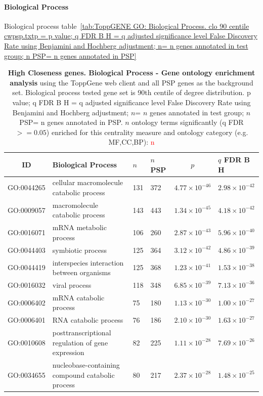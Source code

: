 \paragraph{Biological Process}
Biological process table~\ref{tab:ToppGENE GO: Biological Process. clo 90 centile cwpsp.txtp = p value; q FDR B H = q adjusted significance level False Discovery Rate using Benjamini and Hochberg adjustment; n= n genes annotated in test group; n PSP= n genes annotated in PSP}

\begin{table}[ht]
\centering
\begin{adjustbox}{width=\textwidth}
\setlength{\extrarowheight}{2pt}
\begin{tabular}{@{}clllcl@{}}
  \toprule
  ID & Biological Process & $n$ & $n$ PSP & $p$ & $q$ FDR B H \\ 

  \midrule
GO:0044265 & cellular macromolecule catabolic process & 131 & 372 & $4.77 \times 10^{-46}$ & $2.98 \times 10^{-42}$ \\ 
  GO:0009057 & macromolecule catabolic process & 143 & 443 & $1.34 \times 10^{-45}$ & $4.18 \times 10^{-42}$ \\ 
  GO:0016071 & mRNA metabolic process & 106 & 260 & $2.87 \times 10^{-43}$ & $5.96 \times 10^{-40}$ \\ 
  GO:0044403 & symbiotic process & 125 & 364 & $3.12 \times 10^{-42}$ & $4.86 \times 10^{-39}$ \\ 
  GO:0044419 & interspecies interaction between organisms & 125 & 368 & $1.23 \times 10^{-41}$ & $1.53 \times 10^{-38}$ \\ 
  GO:0016032 & viral process & 118 & 348 & $6.85 \times 10^{-39}$ & $7.13 \times 10^{-36}$ \\ 
  GO:0006402 & mRNA catabolic process & 75 & 180 & $1.13 \times 10^{-30}$ & $1.00 \times 10^{-27}$ \\ 
  GO:0006401 & RNA catabolic process & 76 & 186 & $2.10 \times 10^{-30}$ & $1.63 \times 10^{-27}$ \\ 
  GO:0010608 & posttranscriptional regulation of gene expression & 82 & 225 & $1.11 \times 10^{-28}$ & $7.69 \times 10^{-26}$ \\ 
  GO:0034655 & nucleobase-containing compound catabolic process & 80 & 217 & $2.37 \times 10^{-28}$ & $1.48 \times 10^{-25}$ \\ 
   \bottomrule
\end{tabular}
\end{adjustbox}
\caption[Gene ontology enrichment High Closeness genes Biological Process of genes above 90th centile of distribution]{\textbf{High Closeness genes. Biological Process - Gene ontology enrichment analysis} using the ToppGene web client and all PSP genes as the background set.  Biological process tested gene set is 90th centile of degree distribution.  p value; q FDR B H = q adjusted significance level False Discovery Rate using Benjamini and Hochberg adjustment; $n$= $n$ genes annotated in test group; $n$ PSP= n genes annotated in PSP. $n$ ontology terms significantly (q FDR$>=0.05$) enriched for this centrality measure and ontology category (e.g. MF,CC,BP): \textcolor{red}{n}} 


\end{table}
